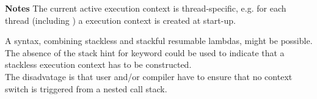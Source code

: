 {\bf Notes}
\newline
The current active execution context is thread-specific, e.g. for each thread
(including \main) a execution context is created at start-up.

A syntax, combining stackless and stackful resumable lambdas, might be possible.
The absence of the stack hint for keyword \resumable could be used to indicate
that a stackless execution context has to be constructed.\\
The disadvatage is that user and/or compiler have to ensure that no context
switch is triggered from a nested call stack.
